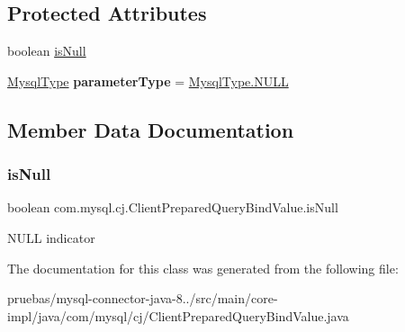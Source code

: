\subsection*{Protected Attributes}
\begin{DoxyCompactItemize}
\item 
boolean \mbox{\hyperlink{classcom_1_1mysql_1_1cj_1_1_client_prepared_query_bind_value_a5f070c408a6a65deaf0c2581f34cdfe9}{is\+Null}}
\item 
\mbox{\label{classcom_1_1mysql_1_1cj_1_1_client_prepared_query_bind_value_aa529f8247427184b1dfc546a6d795165}} 
\mbox{\hyperlink{enumcom_1_1mysql_1_1cj_1_1_mysql_type}{Mysql\+Type}} {\bfseries parameter\+Type} = \mbox{\hyperlink{enumcom_1_1mysql_1_1cj_1_1_mysql_type_afd999a269aedd95acf6ae2453b95e2a3}{Mysql\+Type.\+N\+U\+LL}}
\end{DoxyCompactItemize}


\subsection{Member Data Documentation}
\mbox{\label{classcom_1_1mysql_1_1cj_1_1_client_prepared_query_bind_value_a5f070c408a6a65deaf0c2581f34cdfe9}} 
\subsubsection{\texorpdfstring{is\+Null}{isNull}}
{\footnotesize\ttfamily boolean com.\+mysql.\+cj.\+Client\+Prepared\+Query\+Bind\+Value.\+is\+Null\hspace{0.3cm}{\ttfamily [protected]}}

N\+U\+LL indicator 

The documentation for this class was generated from the following file\+:\begin{DoxyCompactItemize}
\item 
pruebas/mysql-\/connector-\/java-\/8../src/main/core-\/impl/java/com/mysql/cj/Client\+Prepared\+Query\+Bind\+Value.\+java\end{DoxyCompactItemize}
